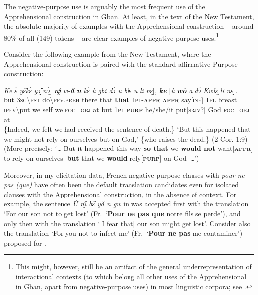 \documentclass[output=paper,colorlinks,citecolor=brown
]{langscibook}
\begin{document}
 The negative-purpose use is arguably the most frequent use of the Apprehensional construction in Gban. At least, in the text of the New Testament, the absolute majority of examples with the Apprehensional construction -- around 80\% of all (149) tokens -- are clear examples of negative-purpose uses.\footnote{This might, however, still be an artifact of the general underrepresentation of interactional contexts (to which belong all other uses of the Apprehensional in Gban, apart from negative-purpose uses) in most linguistic corpora; see \citet[259--260]{vuillermet2018}.}

Consider the following example from the New Testament, where the Apprehensional construction is paired with the standard affirmative Purpose construction:


\ea \label{ex:Fed65}
\gll \textit{Ke} \textit{ɛ́} \textit{yɛ̏kɛ́} \textit{yɔ̰̈} \textit{nɔ̰́} \textup{[}\textit{\textbf{nı̰́}} \textit{w-\textbf{a̋}} \textit{\textbf{n{\ù}}} \textit{kɛ̀} \textit{ù} \textit{gbi} \textit{dɔ́} \textit{u} \textit{blɛ} \textit{u} \textit{li} \textit{nɛ̰}\textup{]}\textit{,} \textit{\textbf{ke}} \textup{[}\textit{ù} \textit{\textbf{wò}} \textit{a} \textit{dɔ̀} \textit{Kwlɛ̰} \textit{li} \textit{nɛ̰}\textup{]}\textit{.} \\
but \textsc{3sg\backslash pst} do\backslash\textsc{pfv.preh} there that \textbf{that} \textsc{1pl-\textbf{appr}} \textsc{\textbf{appr}} say[\textsc{inf}] \textsc{1pl} breast \textsc{ipfv\backslash}put we self we \textsc{foc\_obj} at but \textsc{1pl} \textsc{\textbf{purp}} he/she/it put[\textsc{sbjv?}] God \textsc{foc\_obj} at \\
\glt \{Indeed, we felt we had received the sentence of death.\} `But this happened that we might not rely on ourselves but on God,' \{who raises the dead.\} (2 Cor. 1:9) \\
(More precisely: `{\dots} But it happened this way \textbf{so that} we \textbf{would not} want[\textbf{\textsc{appr}}] to rely on ourselves, \textbf{but} that we \textbf{would} rely[\textbf{\textsc{purp}}] on God~{\dots}')
\z

 Moreover, in my elicitation data, French negative-purpose clauses with \textit{pour ne pas (que)} have often been the default translation candidates even for isolated clauses with the Apprehensional construction, in the absence of context. For example, the sentence \textit{Ù nı̰̋ bɛ̏ yǎ n{\ù} gw{\à}} in  was accepted first with the translation `For our son not to get lost' (Fr.\ `\textbf{Pour ne pas que} notre fils se perde'), and only then with the translation `[I fear that] our son might get lost'. Consider also the translation `For you not to infect me' (Fr.\ `\textbf{Pour ne pas} me contaminer') proposed for .
\end{document}
